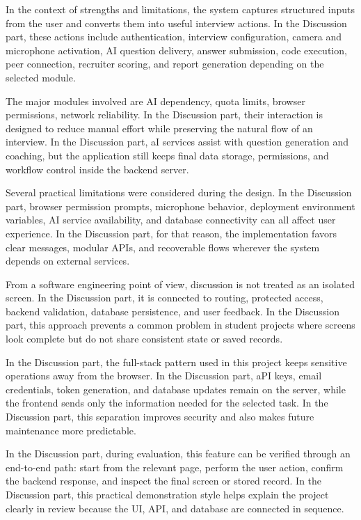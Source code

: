 \documentclass[12pt,a4paper]{report}
\begin{document}
In the context of strengths and limitations, the system captures structured inputs from the user and converts them into useful interview actions. In the Discussion part, these actions include authentication, interview configuration, camera and microphone activation, AI question delivery, answer submission, code execution, peer connection, recruiter scoring, and report generation depending on the selected module.


The major modules involved are AI dependency, quota limits, browser permissions, network reliability. In the Discussion part, their interaction is designed to reduce manual effort while preserving the natural flow of an interview. In the Discussion part, aI services assist with question generation and coaching, but the application still keeps final data storage, permissions, and workflow control inside the backend server.


Several practical limitations were considered during the design. In the Discussion part, browser permission prompts, microphone behavior, deployment environment variables, AI service availability, and database connectivity can all affect user experience. In the Discussion part, for that reason, the implementation favors clear messages, modular APIs, and recoverable flows wherever the system depends on external services.


From a software engineering point of view, discussion is not treated as an isolated screen. In the Discussion part, it is connected to routing, protected access, backend validation, database persistence, and user feedback. In the Discussion part, this approach prevents a common problem in student projects where screens look complete but do not share consistent state or saved records.


In the Discussion part, the full-stack pattern used in this project keeps sensitive operations away from the browser. In the Discussion part, aPI keys, email credentials, token generation, and database updates remain on the server, while the frontend sends only the information needed for the selected task. In the Discussion part, this separation improves security and also makes future maintenance more predictable.


In the Discussion part, during evaluation, this feature can be verified through an end-to-end path: start from the relevant page, perform the user action, confirm the backend response, and inspect the final screen or stored record. In the Discussion part, this practical demonstration style helps explain the project clearly in review because the UI, API, and database are connected in sequence.
\end{document}
